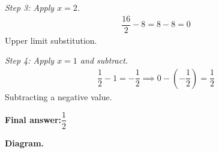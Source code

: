 \documentclass[11pt]{article}
\begin{document}
\textit{Step 3: Apply \( x = 2 \).}
\[\begin{gathered}
\dfrac{16}{2} - 8 = 8 - 8 = 0
\end{gathered}\]
Upper limit substitution.

\textit{Step 4: Apply \( x = 1 \) and subtract.}
\[\begin{gathered}
\dfrac{1}{2} - 1 = -\dfrac{1}{2} \implies 0 - \left(-\dfrac{1}{2}\right) = \dfrac{1}{2}
\end{gathered}\]
Subtracting a negative value.

\begin{answerbox}
\textbf{Final answer:}\quad \(\displaystyle \dfrac{1}{2}\)
\end{answerbox}
\textbf{Diagram.}

\begin{center}
\end{center}
\end{document}
